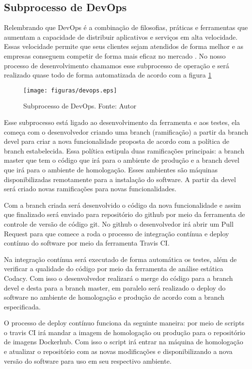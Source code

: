 \subsection{Subprocesso de DevOps}

Relembrando que DevOps é a combinação de filosofias, práticas e ferramentas que aumentam a capacidade de distribuir aplicativos e serviços em alta velocidade. Essas velocidade permite que seus clientes sejam atendidos de forma melhor e as empresas conseguem competir de forma mais eficaz no mercado \cite{amazon}. No nosso processo de desenvolvimento chamamos esse subprocesso de operação e será realizado quase todo de forma automatizada de acordo com a figura \ref{fig:devops}

\begin{figure}[H]
	\centering
  \texttt{[image: figuras/devops.eps]}
  \caption[Subprocesso de DevOps.]{Subprocesso de DevOps. Fonte: Autor}
	\label{fig:devops}
\end{figure}

Esse subprocesso está ligado ao desenvolvimento da ferramenta e aos testes, ela começa com o desenvolvedor criando uma branch (ramificação) a partir da branch devel para criar a nova funcionalidade proposta de acordo com a política de branch estabelecida. Essa política estipula duas ramificações principais: a branch master que tem o código que irá para o ambiente de produção e a branch devel que irá para o ambiente de homologação. Esses ambientes são máquinas disponibilizadas remotamente para a instalação do software. A partir da devel será criado novas ramificações para novas funcionalidades.

Com a branch criada será desenvolvido o código da nova funcionalidade e assim que finalizado será enviado para repositório do github por meio da ferramenta de controle de versão de código git. No github o desenvolvedor irá abrir um Pull Request para que comece a roda o processo de integração contínua e deploy contínuo do software por meio da ferramenta Travis CI.

Na integração contínua será executado de forma automática os testes, além de verificar a qualidade do código por meio da ferramenta de análise estática Codacy. Com isso o desenvolvedor realizará o merge do código para a branch devel e desta para a branch master, em paralelo será realizado o deploy do software no ambiente de homologação e produção de acordo com a branch especificada.

O processo de deploy contínuo funciona da seguinte maneira: por meio de scripts o travis CI irá mandar a imagem de homologação ou produção para o repositório de imagens Dockerhub. Com isso o script irá entrar na máquina de homologação e atualizar o repositório com as novas modificações e disponibilizando a nova versão do software para uso em seu respectivo ambiente.
